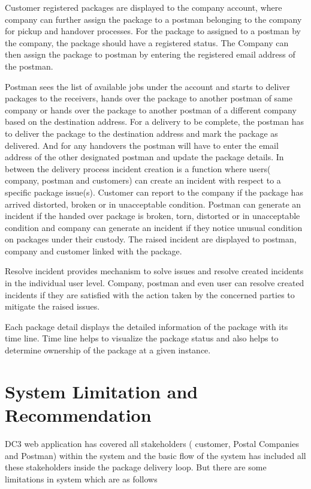 Customer registered packages are displayed to the company account, where company can further assign the package to a postman belonging to the company for pickup and handover processes. For the package to assigned to a postman by the company, the package should have a registered status. The Company can then assign the package to postman by entering the registered email address of the postman.

Postman sees the list of available jobs under the account and starts to deliver packages to the receivers, hands over the package to another postman of same company or hands over the package to another postman of a different company based on the destination address. For a delivery to be complete, the postman has to deliver the package to the destination address and mark the package as delivered. And for any handovers the postman will have to enter the email address of the other designated postman and update the package details.
In between the delivery process incident creation is a function where users( company, postman and customers) can create an incident with respect to a specific package issue(s). Customer can report to the company if the package has arrived distorted, broken or in unacceptable condition. Postman can generate an incident if the handed over package is broken, torn, distorted or in unacceptable condition and company can generate an incident if they notice unusual condition on packages under their custody. The raised incident are displayed to postman, company and customer linked with the package.

Resolve incident provides mechanism to solve issues and resolve created incidents in the individual user level. Company, postman and even user can resolve created incidents if they are satisfied with the action taken by the concerned parties to mitigate the raised issues.

Each package detail displays the detailed information of the package with its time line. Time line helps to visualize the package status and also helps to determine ownership of the package at a given instance.

\section{System Limitation and Recommendation}
DC3  web application has covered all stakeholders ( customer, Postal Companies and Postman) within the system and the basic flow of the system has included all these stakeholders inside the package delivery loop. But there are some limitations in system which are as follows

